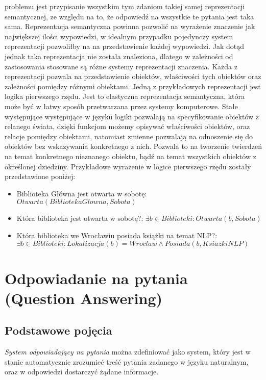 \documentclass[a4paper, twoside, 12pt]{report}
\begin{document}
                problemu jest przypisanie wszystkim tym zdaniom takiej samej reprezentacji semantycznej, ze względu na to, że
                odpowiedź na wszystkie te pytania jest taka sama. Reprezentacja semantyczna powinna pozwolić na wyrażenie
                znaczenie jak największej ilości wypowiedzi, w idealnym przypadku pojedynczy system reprezentacji pozwoliłby
                na na przedstawienie każdej wypowiedzi. Jak dotąd jednak taka reprezentacja nie została znaleziona, dlatego
                w zależności od zastosowania stosowane są różne systemy reprezentacji znaczenia. Każda z reprezentacji
                pozwala na przedstawienie obiektów, właściwości tych obiektów oraz zależności pomiędzy różnymi obiektami.
                Jedną z przykładowych reprezentacji jest logika pierwszego rzędu. Jest to elastyczna reprezentacja semantyczna,
                która może być w łatwy sposób przetwarzana przez systemy komputerowe. Stałe występujące występujące w języku
                logiki pozwalają na specyfikowanie obiektów z relanego świata, dzięki funkcjom możemy opisywać właściwości
                obiektów, oraz relacje pomiędzy obiektami, natomiast zmienne pozwalają na odnoszenie się do obiektów bez wskazywania
                konkretnego z nich. Pozwala to na tworzenie twierdzeń na temat konkretnego nieznanego obiektu, bądź na temat
                wszystkich obiektów z określonej dziedziny. Przykładowe wyrażenie w logice pierwszego rzędu zostały przedstawione
                poniżej:
                \begin{itemize}
                    \item Biblioteka Główna jest otwarta w sobotę: $ Otwarta(BibliotekaGlowna, Sobota) $
                    \item Która biblioteka jest otwarta w sobotę?: $ \exists b \in Biblioteki: Otwarta(b, Sobota) $
                    \item Która biblioteka we Wrocławiu posiada książki na temat NLP?: \\ $ \exists b \in Biblioteki: Lokalizacja(b) = Wroclaw \land Posiada(b, KsiazkiNLP) $
                \end {itemize}


    \section{Odpowiadanie na pytania (Question Answering)}
        \subsection{Podstawowe pojęcia}
            \emph{System odpowiadający na pytania} można zdefiniować jako system, który jest w stanie automatycznie
            zrozumieć treść pytania zadanego w języku naturalnym, oraz w odpowiedzi dostarczyć żądane informacje\cite{HANDBOOKNLP}.
\end{document}

